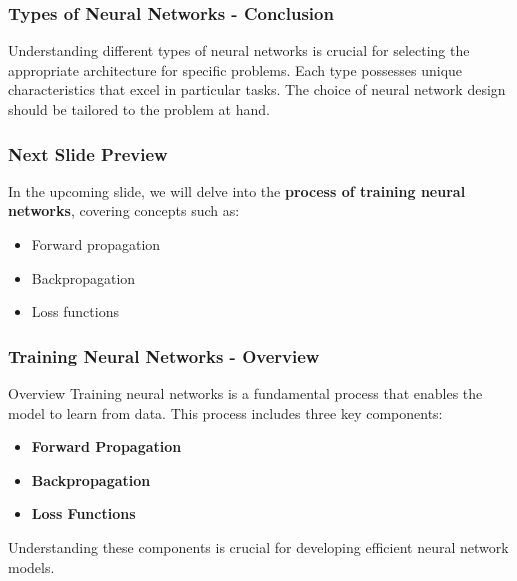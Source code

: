 \documentclass[aspectratio=169]{beamer}
\begin{document}
\begin{frame}[fragile]
    \frametitle{Types of Neural Networks - Conclusion}
    Understanding different types of neural networks is crucial for selecting the appropriate architecture for specific problems. Each type possesses unique characteristics that excel in particular tasks. The choice of neural network design should be tailored to the problem at hand.
\end{frame}

\begin{frame}[fragile]
    \frametitle{Next Slide Preview}
    In the upcoming slide, we will delve into the \textbf{process of training neural networks}, covering concepts such as:
    \begin{itemize}
        \item Forward propagation
        \item Backpropagation
        \item Loss functions
    \end{itemize}
\end{frame}

\begin{frame}[fragile]
    \frametitle{Training Neural Networks - Overview}
    \begin{block}{Overview}
        Training neural networks is a fundamental process that enables the model to learn from data. This process includes three key components: 
        \begin{itemize}
            \item \textbf{Forward Propagation}
            \item \textbf{Backpropagation}
            \item \textbf{Loss Functions}
        \end{itemize}
        Understanding these components is crucial for developing efficient neural network models.
    \end{block}
\end{frame}
\end{document}
